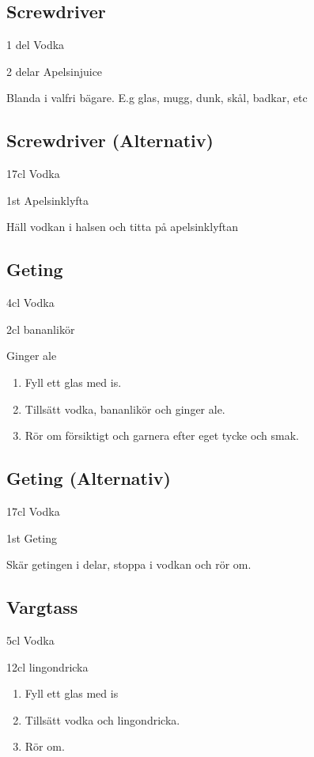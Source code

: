 \subsection*{\textbf{Screwdriver}}

1 del Vodka

2 delar Apelsinjuice

Blanda i valfri bägare. E.g glas, mugg, dunk, skål, badkar, etc
\filbreak
\subsection*{\textbf{Screwdriver (Alternativ)}}

17cl Vodka

1st Apelsinklyfta

Häll vodkan i halsen och titta på apelsinklyftan
\filbreak
\subsection*{\textbf{Geting}}

4cl Vodka

2cl bananlikör

Ginger ale

\begin{enumerate}
    \item Fyll ett glas med is.
    \item Tillsätt vodka, bananlikör och ginger ale.
    \item Rör om försiktigt och garnera efter eget tycke och smak.
\end{enumerate}
\filbreak
\subsection*{\textbf{Geting (Alternativ)}}

17cl Vodka

1st Geting

Skär getingen i delar, stoppa i vodkan och rör om.
\filbreak
\subsection*{\textbf{Vargtass}}

5cl Vodka

12cl lingondricka

\begin{enumerate}
    \item Fyll ett glas med is
    \item Tillsätt vodka och lingondricka.
    \item Rör om.
\end{enumerate}
\filbreak
